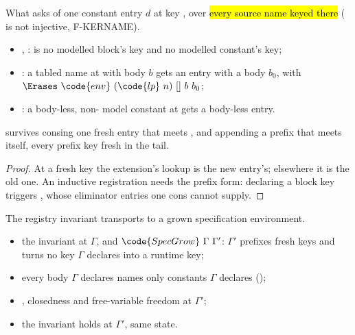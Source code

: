 \begin{definition}
\label{def:SpecEntryOk}
\leanok
{}
 What  asks of one constant entry $d$ at key , over
\hl{every source name keyed there} ( is not injective, F-KERNAME).
\begin{itemize}
\item {}, :  is no modelled block's key and no modelled 
constant's key;
\item {}: a tabled name at  with body $b$ gets an entry with a body $b_0$, with
$\Erases\ \code{env}\ (\code{lp}\ n)\ []\ b\ b_0$;
\item {}: a body-less, non- model constant at  gets a body-less entry.
\end{itemize}
\end{definition}
\begin{lemma}
\label{lem:SpecContent-append}
\leanok
{}
  survives consing one fresh entry that meets , and
appending a prefix that meets  itself, every prefix key fresh in the tail.
\end{lemma}
\begin{proof}
\leanok
{}
 At a fresh key the extension's lookup is the new entry's; elsewhere it is the old one. An
inductive registration needs the prefix form: declaring a block key triggers ,
whose eliminator entries one cons cannot supply.
\end{proof}
\begin{lemma}
\label{lem:RegInvShape-prime-specGrow}
\leanok
{}
 The registry invariant transports to a grown specification environment.
\begin{itemize}
\item {} the invariant at $\Gamma$, and $\code{SpecGrow}\ \Gamma\ \Gamma'$: $\Gamma'$ prefixes
fresh keys and turns no key $\Gamma$ declares into a runtime key;
\item every body $\Gamma$ declares names only constants $\Gamma$ declares ();
\item {}, closedness and free-variable freedom at $\Gamma'$;
\item {} the invariant holds at $\Gamma'$, same state.
\end{itemize}
\end{lemma}
